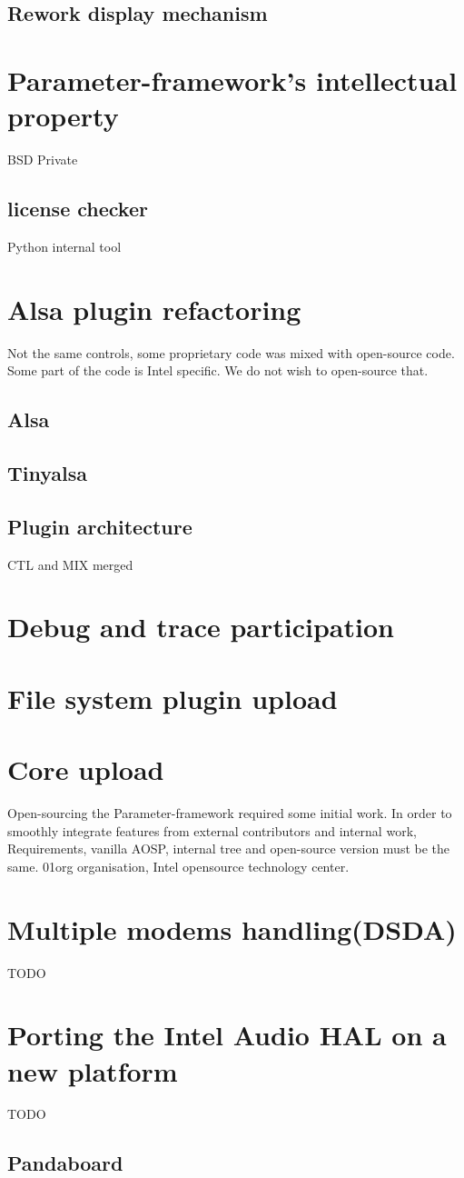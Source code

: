 \subsection{Rework display mechanism}

\section{Parameter-framework's intellectual property}
BSD
Private
\subsection{license checker}
Python internal tool

\section{Alsa plugin refactoring}
Not the same controls, some proprietary code was mixed with open-source code.
Some part of the code is Intel specific. We do not wish to open-source that.

\subsection{Alsa}
\subsection{Tinyalsa}
\subsection{Plugin architecture}
CTL and MIX merged

\section{Debug and trace participation}

\section{File system plugin upload}

\section{Core upload}
Open-sourcing the Parameter-framework required some initial work.
In order to smoothly integrate features from external contributors and internal work,
Requirements, vanilla AOSP, internal tree and open-source version must be the
same.
01org organisation, Intel opensource technology center.

\section{Multiple modems handling(DSDA)}
TODO

\section{Porting the Intel Audio HAL on a new platform}
TODO
\subsection{Pandaboard}

